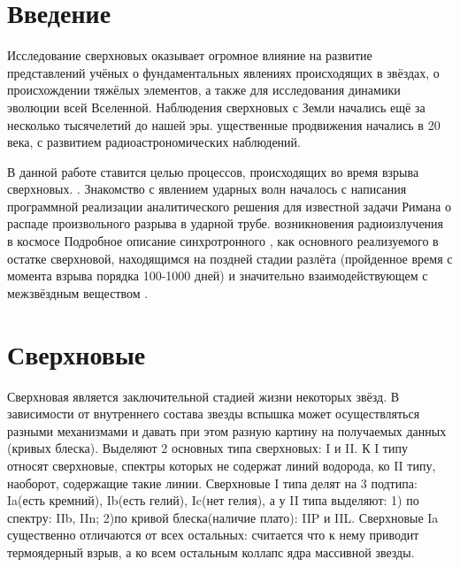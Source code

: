 \documentclass[a4paper,12pt]{extarticle}
\begin{document}
\section{Введение}
Исследование сверхновых оказывает огромное влияние на развитие представлений учёных о фундаментальных явлениях происходящих в звёздах, о происхождении тяжёлых элементов, а также для исследования динамики эволюции всей Вселенной. 
Наблюдения сверхновых с Земли начались ещё за несколько тысячелетий до нашей эры. 
ущественные продвижения начались в  20 века, с развитием радиоастрономических наблюдений.

В данной работе ставится целью  процессов, происходящих во время взрыва сверхновых. 
. 
Знакомство с явлением ударных волн началось с написания программной реализации аналитического решения для известной задачи Римана о распаде произвольного разрыва в ударной трубе.
%
 возникновения радиоизлучения в космосе
 Подробное описание синхротронного , как основного реализуемого в остатке сверхновой, находящимся на поздней стадии разлёта (пройденное время с момента взрыва порядка 100-1000 дней) и значительно взаимодействующем с межзвёздным веществом . 


\section{Сверхновые}
Сверхновая является заключительной стадией жизни некоторых звёзд.{\cite{Shklov1984}} В зависимости от внутреннего состава звезды вспышка может осуществляться разными механизмами и давать при этом разную картину на получаемых данных (кривых блеска). Выделяют 2 основных типа сверхновых: I и II. К I типу относят сверхновые, спектры которых не содержат линий водорода, ко II типу, наоборот, содержащие такие линии. Сверхновые I типа делят на 3 подтипа: Ia(есть кремний), Ib(есть гелий), Ic(нет гелия), а у II типа выделяют: 1) по спектру: IIb, IIn; 2)по кривой блеска(наличие плато): IIP и IIL. 
Сверхновые Ia существенно отличаются  от всех остальных: 
считается что к нему приводит термоядерный взрыв, а ко всем остальным коллапс ядра массивной звезды.
\end{document}
